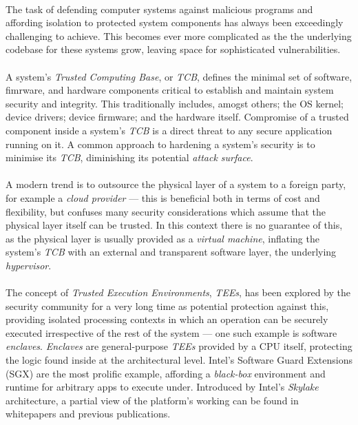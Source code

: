 


\paragraph{} The task of defending computer systems against malicious programs and affording isolation to protected system components has always been exceedingly challenging to achieve. This becomes ever more complicated as the the underlying codebase for these systems grow, leaving space for sophisticated vulnerabilities. 

\paragraph{} A system's \textit{Trusted Computing Base}, or \textit{TCB}, defines the minimal set of software, fimrware, and hardware components critical to establish and maintain system security and integrity. This traditionally includes, amogst others; the OS kernel; device drivers; device firmware; and the hardware itself. Compromise of a trusted component inside a system's \textit{TCB} is a direct threat to any secure application running on it. A common approach to hardening a system's security is to minimise its \textit{TCB}, diminishing its potential \textit{attack surface}. 

\paragraph{} A modern trend is to outsource the physical layer of a system to a foreign party, for example a \textit{cloud provider} --- this is beneficial both in terms of cost and flexibility, but confuses many security considerations which assume that the physical layer itself can be trusted. In this context there is no guarantee of this, as the physical layer is usually provided as a \textit{virtual machine}, inflating the system's \textit{TCB} with an external and transparent software layer, the underlying \textit{hypervisor}.

\paragraph{} The concept of \textit{Trusted Execution Environments}, \textit{TEEs}, has been explored by the security community for a very long time as potential protection against this, providing isolated processing contexts in which an operation can be securely executed irrespective of the rest of the system --- one such example is software \textit{enclaves}. \textit{Enclaves} are general-purpose \textit{TEEs} provided by a CPU itself, protecting the logic found inside at the architectural level. Intel's Software Guard Extensions (SGX) are the most prolific example, affording a \textit{black-box} environment and runtime for arbitrary apps to execute under. Introduced by Intel's \textit{Skylake} architecture, a partial view of the platform's working can be found in whitepapers and previous publications.


